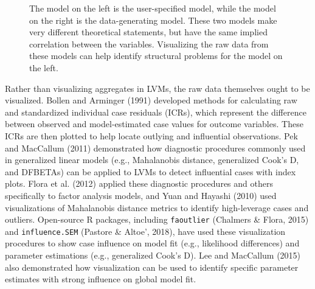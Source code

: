 \documentclass[
  english,
  man]{apa6}
\begin{document}
\begin{figure}
\begin{center}
\caption{The model on the left is the user-specified model, while the model on the right is the data-generating model. These two models make very different theoretical statements, but have the same implied correlation between the variables. Visualizing the raw data from these models can help identify structural problems for the model on the left.}
\label{fig:implied}
\end{center}
\end{figure}

Rather than visualizing aggregates in LVMs, the raw data themselves ought to be visualized. Bollen and Arminger (1991) developed methods for calculating raw and standardized individual case residuals (ICRs), which represent the difference between observed and model-estimated case values for outcome variables. These ICRs are then plotted to help locate outlying and influential observations. Pek and MacCallum (2011) demonstrated how diagnostic procedures commonly used in generalized linear models (e.g., Mahalanobis distance, generalized Cook's D, and DFBETAs) can be applied to LVMs to detect influential cases with index plots. Flora et al. (2012) applied these diagnostic procedures and others specifically to factor analysis models, and Yuan and Hayashi (2010) used visualizations of Mahalanobis distance metrics to identify high-leverage cases and outliers. Open-source R packages, including \texttt{faoutlier} (Chalmers \& Flora, 2015) and \texttt{influence.SEM} (Pastore \& Altoe', 2018), have used these visualization procedures to show case influence on model fit (e.g., likelihood differences) and parameter estimations (e.g., generalized Cook's D). Lee and MacCallum (2015) also demonstrated how visualization can be used to identify specific parameter estimates with strong influence on global model fit.
\end{document}
